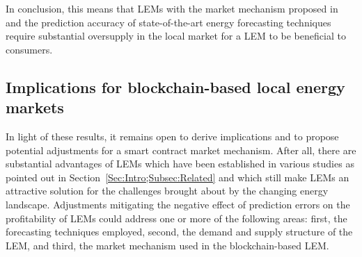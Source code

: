 In conclusion, this means that LEMs with the market mechanism proposed in \citet{Mengelkamp:2018a} and the prediction accuracy of state-of-the-art energy forecasting techniques require substantial oversupply in the local market for a LEM to be beneficial to consumers.




\subsection{Implications for blockchain-based local energy markets}\label{Sec:Results;Subsec:Implications}

In light of these results, it remains open to derive implications and to propose potential adjustments for a smart contract market mechanism. After all, there are substantial advantages of LEMs which have been established in various studies as pointed out in Section~\ref{Sec:Intro;Subsec:Related} and which still make LEMs an attractive solution for the challenges brought about by the changing energy landscape. Adjustments mitigating the negative effect of prediction errors on the profitability of LEMs could address one or more of the following areas: first, the forecasting techniques employed, second, the demand and supply structure of the LEM, and third, the market mechanism used in the blockchain-based LEM.

